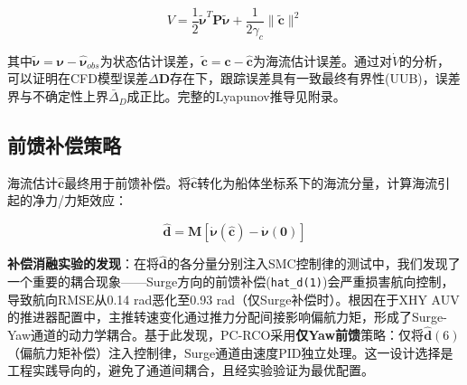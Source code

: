 \begin{equation}
    V = \frac{1}{2}\tilde{\bm{\nu}}^T\bm{P}\tilde{\bm{\nu}} + \frac{1}{2\gamma_c}\|\tilde{\bm{c}}\|^2
    \label{eq:lyapunov}
\end{equation}

其中$\tilde{\bm{\nu}} = \bm{\nu} - \hat{\bm{\nu}}_{obs}$为状态估计误差，$\tilde{\bm{c}} = \bm{c} - \hat{\bm{c}}$为海流估计误差。通过对$\dot{V}$的分析，可以证明在CFD模型误差$\Delta\bm{D}$存在下，跟踪误差具有一致最终有界性(UUB)，误差界与不确定性上界$\bar{\Delta}_D$成正比。完整的Lyapunov推导见附录。

\subsection{前馈补偿策略}

海流估计$\hat{\bm{c}}$最终用于前馈补偿。将$\hat{\bm{c}}$转化为船体坐标系下的海流分量，计算海流引起的净力/力矩效应：

\begin{equation}
    \hat{\bm{d}} = \bm{M}\left[\dot{\bm{\nu}}(\hat{\bm{c}}) - \dot{\bm{\nu}}(\bm{0})\right]
    \label{eq:feedforward}
\end{equation}

\textbf{补偿消融实验的发现}：在将$\hat{\bm{d}}$的各分量分别注入SMC控制律的测试中，我们发现了一个重要的耦合现象——Surge方向的前馈补偿(\texttt{hat\_d(1)})会严重损害航向控制，导致航向RMSE从0.14 rad恶化至0.93 rad（仅Surge补偿时）。根因在于XHY AUV的推进器配置中，主推转速变化通过推力分配间接影响偏航力矩，形成了Surge-Yaw通道的动力学耦合。基于此发现，PC-RCO采用\textbf{仅Yaw前馈}策略：仅将$\hat{\bm{d}}(6)$（偏航力矩补偿）注入控制律，Surge通道由速度PID独立处理。这一设计选择是工程实践导向的，避免了通道间耦合，且经实验验证为最优配置。
